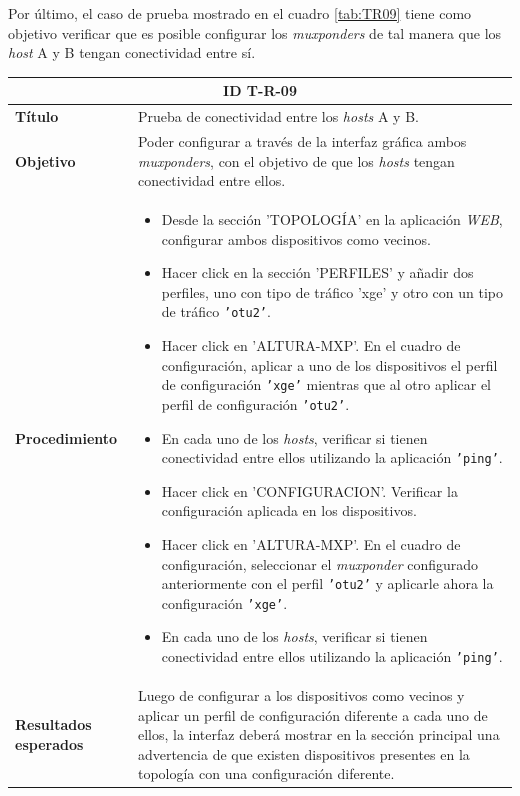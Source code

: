       Por último, el caso de prueba mostrado en el cuadro \ref{tab:TR09} tiene como objetivo verificar que es posible configurar los \textit{muxponders} de tal manera que los \textit{host} A y B tengan conectividad entre sí. 

      \begin{table}[H]
        \centering
        \begin{tabular}{ |m{2.5cm}|m{11cm}|  }
        \hline
        \multicolumn{2}{|c|}{ \textbf{ID T-R-09} } \\
        \hline
        \centering
        \textbf{Título} & Prueba de conectividad entre los \textit{hosts} A y B.  \\
        \hline
        \centering
        \textbf{Objetivo} & Poder configurar a través de la interfaz gráfica ambos \textit{muxponders}, con el objetivo de que los \textit{hosts} tengan conectividad entre ellos.   \\
        \hline
        \centering
        \textbf{Procedimiento} & \begin{itemize}
          \item Desde la sección 'TOPOLOGÍA' en la aplicación \textit{WEB}, configurar ambos dispositivos como vecinos.
          \item Hacer click en la sección 'PERFILES' y añadir dos perfiles, uno con tipo de tráfico 'xge' y otro con un tipo de tráfico \texttt{'otu2'}.
          \item  Hacer click en 'ALTURA-MXP'. En el cuadro de configuración, aplicar a uno de los dispositivos el perfil de configuración \texttt{'xge'} mientras que al otro aplicar el perfil de configuración \texttt{'otu2'}.
          \item En cada uno de los \textit{hosts}, verificar si tienen conectividad entre ellos utilizando la aplicación \texttt{'ping'}.
          \item Hacer click en 'CONFIGURACION'. Verificar la configuración aplicada en los dispositivos.
          \item Hacer click en 'ALTURA-MXP'. En el cuadro de configuración, seleccionar el \textit{muxponder} configurado anteriormente con el perfil \texttt{'otu2'} y aplicarle ahora la configuración \texttt{'xge'}.
          \item En cada uno de los \textit{hosts}, verificar si tienen conectividad entre ellos utilizando la aplicación \texttt{'ping'}.

        \end{itemize}     \\
        \hline
        \centering
        \textbf{Resultados esperados} & 
        Luego de configurar a los dispositivos como vecinos y aplicar un perfil de configuración diferente a cada uno de ellos, la interfaz deberá mostrar en la sección principal una advertencia de que existen dispositivos presentes en la topología con una configuración diferente. 


\end{tabular}
\end{table}
